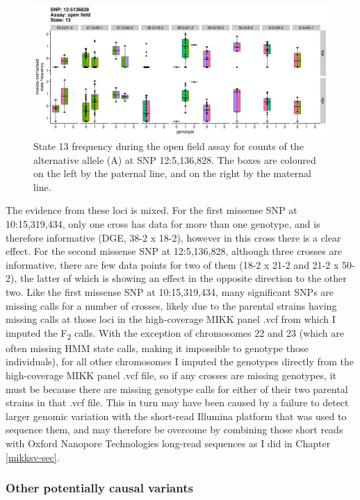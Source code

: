 \documentclass[
]{book}
\begin{document}
\begin{figure}
\includegraphics[width=1\linewidth]{figs/mikk_behaviour/sig_snps_boxplots/13-12:5136828} \caption{State 13 frequency during the open field assay for counts of the alternative allele (A) at SNP 12:5,136,828. The boxes are coloured on the left by the paternal line, and on the right by the maternal line.}\label{fig:sig-snp-12-5mb}
\end{figure}

The evidence from these loci is mixed. For the first missense SNP at 10:15,319,434, only one cross has data for more than one genotype, and is therefore informative (DGE, 38-2 x 18-2), however in this cross there is a clear effect. For the second missense SNP at 12:5,136,828, although three crosses are informative, there are few data points for two of them (18-2 x 21-2 and 21-2 x 50-2), the latter of which is showing an effect in the opposite direction to the other two. Like the first missense SNP at 10:15,319,434, many significant SNPs are missing calls for a number of crosses, likely due to the parental strains having missing calls at those loci in the high-coverage MIKK panel .vcf from which I imputed the F\textsubscript{2} calls. With the exception of chromosomes 22 and 23 (which are often missing HMM state calls, making it impossible to genotype those individuals), for all other chromosomes I imputed the genotypes directly from the high-coverage MIKK panel .vcf file, so if any crosses are missing genotypes, it must be because there are missing genotype calls for either of their two parental strains in that .vcf file. This in turn may have been caused by a failure to detect larger genomic variation with the short-read Illumina platform that was used to sequence them, and may therefore be overcome by combining those short reads with Oxford Nanopore Technologies long-read sequences as I did in Chapter \ref{mikksv-sec}.

\hypertarget{other-potentially-causal-variants}{%
\subsubsection{Other potentially causal variants}\label{other-potentially-causal-variants}}
\end{document}
